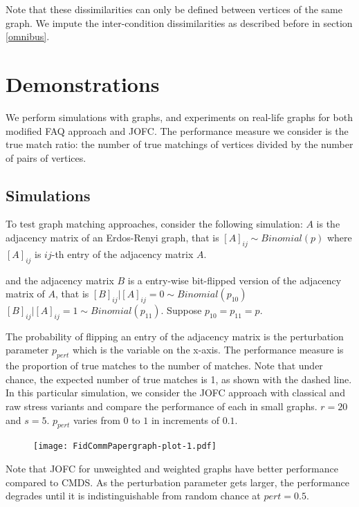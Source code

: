 \documentclass[12pt,oneside,final]{thesis}\usepackage[]{graphicx}\usepackage[]{color}
\begin{document}
 Note that these dissimilarities can only be defined between vertices of the same graph. We impute the inter-condition dissimilarities   as described before in section \ref{omnibus}.
 
\section{Demonstrations}

We perform simulations with graphs, and experiments on real-life graphs for  both modified FAQ approach and JOFC. The performance measure we consider is the true match ratio: the number of true matchings of vertices  divided by the number of pairs of vertices.

\subsection{Simulations}
  To test graph matching approaches, consider the following simulation: $A$ is the adjacency matrix of an Erdos-Renyi graph, that is
  $\left[A\right]_{ij} \sim Binomial(p)$ where $\left[A\right]_{ij}$ is $ij$-th entry of the adjacency matrix  $A$.
 
   and the adjacency matrix  $B$ is a entry-wise bit-flipped version of the adjacency matrix of $A$, that is
   $\left[B\right]_{ij}|\left[A\right]_{ij}=0 \sim Binomial(p_{10})$ $\left[B\right]_{ij}|\left[A\right]_{ij}=1 \sim Binomial(p_{11})$. Suppose $p_{10}=p_{11}=p$.
  
  The probability of flipping an entry of the adjacency matrix is the perturbation parameter $p_{pert}$ which is the variable on the x-axis. 
  The performance measure is the proportion of true matches to the number of matches. Note that 
  under chance, the expected number of true matches is 1, as shown with the dashed line. In this particular simulation, we consider the JOFC approach with classical and raw stress variants and compare the performance of each in small graphs. $r=20$ and $s=5$. $p_{pert}$ varies from $0$ to $1$ in increments of $0.1$.  
  
\begin{figure}
  \texttt{[image: FidCommPapergraph-plot-1.pdf]}
\end{figure}












Note that JOFC for unweighted and weighted graphs  have better performance compared to CMDS. As the perturbation parameter gets larger, the performance degrades until it is indistinguishable from random chance at $pert=0.5$.
\end{document}
